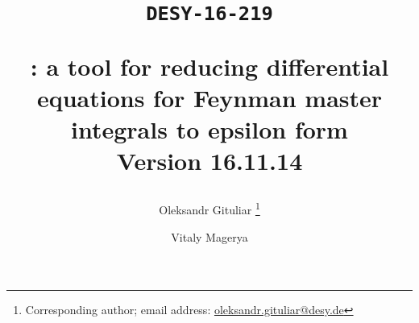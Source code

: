 \title{
  \begin{flushright}
  \tt\normalsize{DESY-16-219}\\ 
  \end{flushright}
  \vspace{1cm}
  \Large \bf \fuchsia: a tool for reducing differential equations for Feynman master integrals to epsilon form\\
  \vspace{0.5cm}
  \normalsize \bf Version 16.11.14
}

\author[a]{Oleksandr Gituliar%
    \thanks{Corresponding author; email address:
        \href{mailto:oleksandr.gituliar@desy.de}
            {oleksandr.gituliar@desy.de}}}

\author[b]{Vitaly Magerya}



